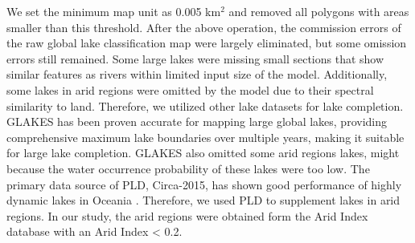 \documentclass[preprint,12pt,authoryear]{elsarticle}
\begin{document}
We set the minimum map unit as 0.005 km$^2$ and removed all polygons with areas smaller than this threshold. After the above operation, the commission errors of the raw global lake classification map were largely eliminated, but some omission errors still remained. Some large lakes were missing small sections that show similar features as rivers within limited input size of the model. Additionally, some lakes in arid regions were omitted by the model due to their spectral similarity to land. Therefore, we utilized other lake datasets for lake completion. GLAKES has been proven accurate for mapping large global lakes, providing comprehensive maximum lake boundaries over multiple years, making it suitable for large lake completion. GLAKES also omitted some arid regions lakes, might because the water occurrence probability of these lakes were too low. The primary data source of PLD, Circa-2015, has shown good performance of highly dynamic lakes in Oceania \citep{sheng_representative_2016}. Therefore, we used PLD to supplement lakes in arid regions. In our study, the arid regions were obtained form the Arid Index database \citep{zomer_version_2022} with an Arid Index < 0.2.
\end{document}
